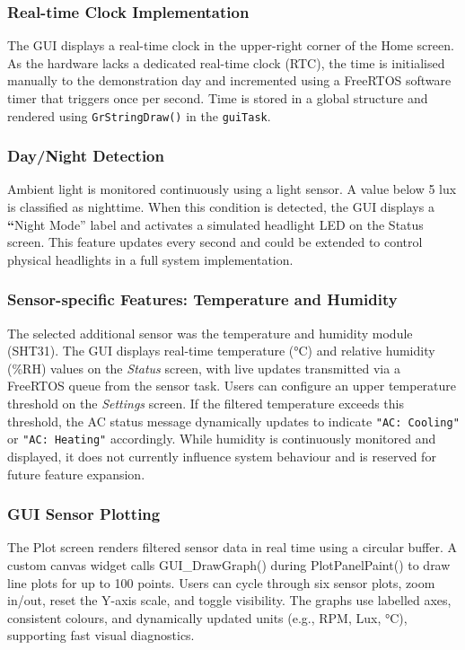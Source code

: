 \documentclass[a4paper, 11pt, titlepage]{article}
\begin{document}
\subsubsection{Real-time Clock Implementation}
The GUI displays a real-time clock in the upper-right corner of the Home screen. As the hardware lacks a dedicated real-time clock (RTC), the time is initialised manually to the demonstration day and incremented using a FreeRTOS software timer \parencite{freertos} that triggers once per second. Time is stored in a global structure and rendered using \verb|GrStringDraw()| in the \verb|guiTask|. \\

\subsubsection{Day/Night Detection}
Ambient light is monitored continuously using a light sensor. A value below 5 lux is classified as nighttime. When this condition is detected, the GUI displays a \textbf{“}Night Mode” label and activates a simulated headlight LED on the Status screen. This feature updates every second and could be extended to control physical headlights in a full system implementation. \\

\subsubsection{Sensor-specific Features: Temperature and Humidity}
The selected additional sensor was the temperature and humidity module (SHT31). The GUI displays real-time temperature (°C) and relative humidity (\%RH) values on the \textit{Status} screen, with live updates transmitted via a FreeRTOS queue from the sensor task. Users can configure an upper temperature threshold on the \textit{Settings} screen. If the filtered temperature exceeds this threshold, the AC status message dynamically updates to indicate \texttt{"AC: Cooling"} or \texttt{"AC: Heating"} accordingly. While humidity is continuously monitored and displayed, it does not currently influence system behaviour and is reserved for future feature expansion.\\


\subsubsection{GUI Sensor Plotting}
The Plot screen renders filtered sensor data in real time using a circular buffer. A custom canvas widget calls GUI\_DrawGraph() during PlotPanelPaint() to draw line plots for up to 100 points. Users can cycle through six sensor plots, zoom in/out, reset the Y-axis scale, and toggle visibility. The graphs use labelled axes, consistent colours, and dynamically updated units (e.g., RPM, Lux, °C), supporting fast visual diagnostics.\\
\end{document}

